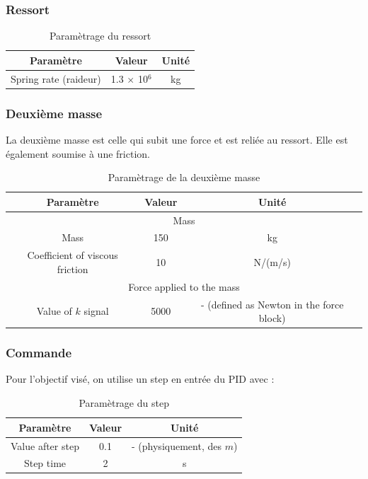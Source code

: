 \documentclass[a4paper,12pt,calibri,oneside,openany]{book}
\theoremstyle{break}
\begin{document}
\subsubsection{Ressort}

\begin{table}[H]
	\centering
	\begin{tabular}{|c|c|c|}
		\hline
		\cellcolor{gray!30}Paramètre & \cellcolor{gray!30}Valeur & \cellcolor{gray!30}Unité\\
		\hline
		Spring rate (raideur) & 1.3 $\times$ 10$^6$ & kg\\
		\hline
	\end{tabular}
	\caption{Paramètrage du ressort}
\end{table}
\subsubsection{Deuxième masse}
La deuxième masse est celle qui subit une force et est reliée au ressort. Elle est également soumise à une friction.
\begin{table}[H]
	\centering
	\begin{tabular}{|c|c|c|}
		\hline
		\cellcolor{gray!30}Paramètre & \cellcolor{gray!30}Valeur & \cellcolor{gray!30}Unité\\
		\hline
		\multicolumn{3}{c}{\cellcolor{green!30}Mass} \\
		\hline
		Mass & 150 & kg\\
		\hline
		Coefficient of viscous friction & 10 & N/(m/s)\\
		\hline
		\multicolumn{3}{c}{\cellcolor{green!30}Force applied to the mass} \\
		\hline
		Value of $k$ signal & 5000 & - (defined as Newton in the force block)\\
		\hline
	\end{tabular}
	\caption{Paramètrage de la deuxième masse}
\end{table}
\subsubsection{Commande}
Pour l'objectif visé, on utilise un step en entrée du PID avec : 
\begin{table}[H]
	\centering
	\begin{tabular}{|c|c|c|}
		\hline
		\cellcolor{gray!30}Paramètre & \cellcolor{gray!30}Valeur & \cellcolor{gray!30}Unité\\
		\hline
	    Value after step & 0.1 & - (physiquement, des $m$)\\
		\hline
		Step time & 2 & s\\
		\hline
	\end{tabular}
	\caption{Paramètrage du step}
\end{table}
\end{document}
